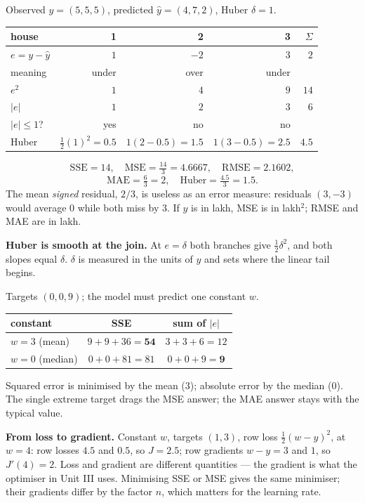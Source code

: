 \documentclass[11pt]{article}
\begin{document}
\begin{worked}
Observed $y = (5, 5, 5)$, predicted $\hat y = (4, 7, 2)$, Huber $\delta = 1$.
\begin{center}
\begin{tabular}{@{}lrrr|r@{}}
\toprule
house & 1 & 2 & 3 & $\Sigma$\\ \midrule
$e = y - \hat y$ & $1$ & $-2$ & $3$ & $2$\\
meaning & under & over & under & \\
$e^2$ & $1$ & $4$ & $9$ & $14$\\
$|e|$ & $1$ & $2$ & $3$ & $6$\\
$|e| \le 1$? & yes & no & no & \\
Huber & $\tfrac12(1)^2 = 0.5$ & $1(2 - 0.5) = 1.5$ & $1(3 - 0.5) = 2.5$ & $4.5$\\
\bottomrule
\end{tabular}
\end{center}
\[
  \mathrm{SSE} = 14, \quad \mathrm{MSE} = \tfrac{14}{3} = 4.6667, \quad
  \mathrm{RMSE} = 2.1602,
\]
\[
  \mathrm{MAE} = \tfrac63 = 2, \quad
  \text{Huber} = \tfrac{4.5}{3} = 1.5 .
\]
The mean \emph{signed} residual, $2/3$, is useless as an error measure:
residuals $(3, -3)$ would average $0$ while both miss by $3$. If $y$ is in
lakh, MSE is in lakh$^2$; RMSE and MAE are in lakh.

\textbf{Huber is smooth at the join.} At $e = \delta$ both branches give
$\tfrac12\delta^2$, and both slopes equal $\delta$. $\delta$ is measured in
the units of $y$ and sets where the linear tail begins.
\end{worked}

\begin{worked}
Targets $(0, 0, 9)$; the model must predict one constant $w$.
\begin{center}
\begin{tabular}{@{}lcc@{}}
\toprule
constant & SSE & sum of $|e|$\\ \midrule
$w = 3$ (mean) & $9 + 9 + 36 = \mathbf{54}$ & $3 + 3 + 6 = 12$\\
$w = 0$ (median) & $0 + 0 + 81 = 81$ & $0 + 0 + 9 = \mathbf{9}$\\
\bottomrule
\end{tabular}
\end{center}
Squared error is minimised by the mean ($3$); absolute error by the median
($0$). The single extreme target drags the MSE answer; the MAE answer stays
with the typical value.

\textbf{From loss to gradient.} Constant $w$, targets $(1, 3)$, row loss
$\tfrac12(w - y)^2$, at $w = 4$: row losses $4.5$ and $0.5$, so $J = 2.5$; row
gradients $w - y = 3$ and $1$, so $J'(4) = 2$. Loss and gradient are
different quantities --- the gradient is what the optimiser in Unit III uses.
Minimising SSE or MSE gives the same minimiser; their gradients differ by the
factor $n$, which matters for the learning rate.
\end{worked}
\end{document}

